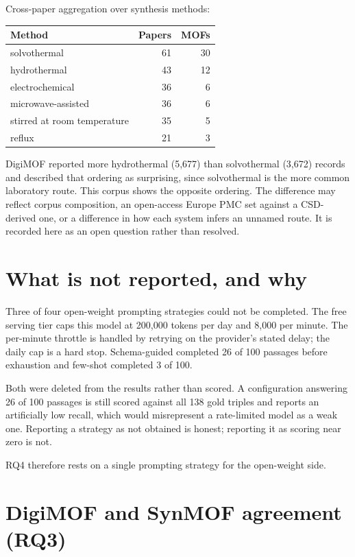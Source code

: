 \documentclass[11pt,a4paper,oneside]{report}
\begin{document}
Cross-paper aggregation over synthesis methods:

\par\medskip
\begingroup
\small\setlength{\tabcolsep}{6pt}
\begin{tabular}{@{}lrr@{}}
\toprule
\textbf{Method} & \textbf{Papers} & \textbf{MOFs} \\
\midrule
solvothermal & 61 & 30 \\
hydrothermal & 43 & 12 \\
electrochemical & 36 & 6 \\
microwave-assisted & 36 & 6 \\
stirred at room temperature & 35 & 5 \\
reflux & 21 & 3 \\
\bottomrule
\end{tabular}
\endgroup
\par\medskip
DigiMOF reported more hydrothermal (5,677) than solvothermal (3,672) records and described that ordering as surprising, since solvothermal is the more common laboratory route. This corpus shows the opposite ordering. The difference may reflect corpus composition, an open-access Europe PMC set against a CSD-derived one, or a difference in how each system infers an unnamed route. It is recorded here as an open question rather than resolved.

\section{What is not reported, and why}

Three of four open-weight prompting strategies could not be completed. The free serving tier caps this model at 200,000 tokens per day and 8,000 per minute. The per-minute throttle is handled by retrying on the provider's stated delay; the daily cap is a hard stop. Schema-guided completed 26 of 100 passages before exhaustion and few-shot completed 3 of 100.

Both were deleted from the results rather than scored. A configuration answering 26 of 100 passages is still scored against all 138 gold triples and reports an artificially low recall, which would misrepresent a rate-limited model as a weak one. Reporting a strategy as not obtained is honest; reporting it as scoring near zero is not.

RQ4 therefore rests on a single prompting strategy for the open-weight side.

\section{DigiMOF and SynMOF agreement (RQ3)}
\end{document}
